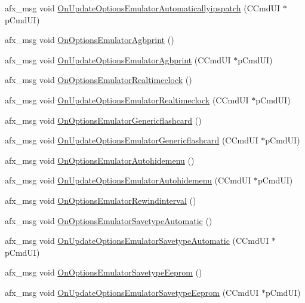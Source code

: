 \begin{DoxyCompactItemize}
\item 
afx\+\_\+msg void \mbox{\hyperlink{class_main_wnd_ae5a5c5ae891dd3cd876325b59a50465b}{On\+Update\+Options\+Emulator\+Automaticallyipspatch}} (C\+Cmd\+UI $\ast$p\+Cmd\+UI)
\item 
afx\+\_\+msg void \mbox{\hyperlink{class_main_wnd_ac4ff3f77ecc063505ba2565d5f54277b}{On\+Options\+Emulator\+Agbprint}} ()
\item 
afx\+\_\+msg void \mbox{\hyperlink{class_main_wnd_aad1f7f9bff514babc68d81e52bdfdd92}{On\+Update\+Options\+Emulator\+Agbprint}} (C\+Cmd\+UI $\ast$p\+Cmd\+UI)
\item 
afx\+\_\+msg void \mbox{\hyperlink{class_main_wnd_a53770e7d481b904a0a3993d7c2e1dedb}{On\+Options\+Emulator\+Realtimeclock}} ()
\item 
afx\+\_\+msg void \mbox{\hyperlink{class_main_wnd_a0db3f50e5b656ca0d67ddfeccfbd4dba}{On\+Update\+Options\+Emulator\+Realtimeclock}} (C\+Cmd\+UI $\ast$p\+Cmd\+UI)
\item 
afx\+\_\+msg void \mbox{\hyperlink{class_main_wnd_a39017815a0e680f2e6db60c49bae967e}{On\+Options\+Emulator\+Genericflashcard}} ()
\item 
afx\+\_\+msg void \mbox{\hyperlink{class_main_wnd_a4f2fe44c9b633dd600d93fbb0b0e3840}{On\+Update\+Options\+Emulator\+Genericflashcard}} (C\+Cmd\+UI $\ast$p\+Cmd\+UI)
\item 
afx\+\_\+msg void \mbox{\hyperlink{class_main_wnd_aad0ef218c2640f431c99fa522c2b3518}{On\+Options\+Emulator\+Autohidemenu}} ()
\item 
afx\+\_\+msg void \mbox{\hyperlink{class_main_wnd_ad3cade08132d08c4db013a0d240cc729}{On\+Update\+Options\+Emulator\+Autohidemenu}} (C\+Cmd\+UI $\ast$p\+Cmd\+UI)
\item 
afx\+\_\+msg void \mbox{\hyperlink{class_main_wnd_aed243489fe737a76bfdabee4a0a1b8f8}{On\+Options\+Emulator\+Rewindinterval}} ()
\item 
afx\+\_\+msg void \mbox{\hyperlink{class_main_wnd_a052e23f4c24c94b273a095d36e660fdd}{On\+Options\+Emulator\+Savetype\+Automatic}} ()
\item 
afx\+\_\+msg void \mbox{\hyperlink{class_main_wnd_a5173da0c1314856915ce11a4c96fa69c}{On\+Update\+Options\+Emulator\+Savetype\+Automatic}} (C\+Cmd\+UI $\ast$p\+Cmd\+UI)
\item 
afx\+\_\+msg void \mbox{\hyperlink{class_main_wnd_ab0b7f0078bb9327c33fa04501e971e57}{On\+Options\+Emulator\+Savetype\+Eeprom}} ()
\item 
afx\+\_\+msg void \mbox{\hyperlink{class_main_wnd_ac10419115fc79d4d6cb8ff3c5bea5e36}{On\+Update\+Options\+Emulator\+Savetype\+Eeprom}} (C\+Cmd\+UI $\ast$p\+Cmd\+UI)

\end{DoxyCompactItemize}
